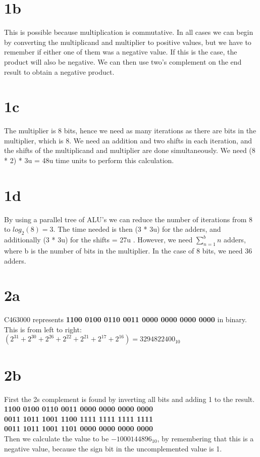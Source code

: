 \documentclass[10pt,a4paper]{article}
\begin{document}
	\section*{1b}
	This is possible because multiplication is commutative. In all cases we can begin by converting the multiplicand and multiplier to positive values, but we have to remember if either one of them was a negative value. If this is the case, the product will also be negative. We can then use two's complement on the end result to
	obtain a negative product.
	\section*{1c}
	The multiplier is 8 bits, hence we need as many iterations as there are bits in the multiplier, which is 8. We need an addition and two shifts in each iteration, and the shifts of the multiplicand and multiplier are done simultaneously. We need (8 * 2) * 3u  = 48u time units to perform this calculation.
	\section*{1d}
	By using a parallel tree of ALU's we can reduce the number of iterations from 8 to $log_{2}(8) = 3$. The time needed is then (3 *  3u) for the adders, and additionally (3 * 3u) for the shifts = 27u . However, we need $\sum_{n=1}^{b} n$ adders, where b is the number of bits in the multiplier. In the case of 8 bits, we need 36 adders.
	\section*{2a}
	C463000 represents \textbf{1100 0100 0110 0011 0000 0000 0000 0000} in binary. This is from left to right: $(2^{31} + 2^{30} + 2^{26} + 2^{22} + 2^{21} + 2^{17} + 2^{16}) = 3294822400_{10}$
	\section*{2b}
	First the 2s complement is found by inverting all bits and adding 1 to the result.
	\textbf{1100 0100 0110 0011 0000 0000 0000 0000} \\
	\textbf{0011 1011 1001 1100 1111 1111 1111 1111} \\
	\textbf{0011 1011 1001 1101 0000 0000 0000 0000} \\
	Then we calculate the value to be $-1000144896_{10}$, by remembering that this is a negative value, because the sign bit in the uncomplemented value is 1.
\end{document}
